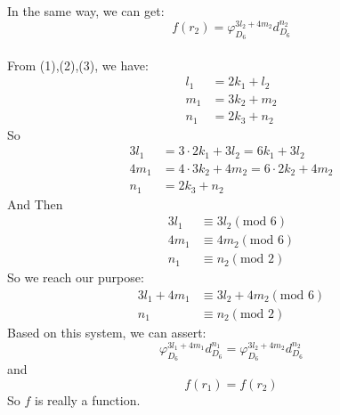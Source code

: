 \documentclass[12pt]{article}
\theoremstyle{neosn}
\begin{document}
    In the same way, we can get:
    $$f(r_2)=\varphi_{D_6}^{3l_2+4m_2}d_{D_6}^{n_2}$$\\  
    From (1),(2),(3), we have:
    \begin{align*}
        l_1 &= 2k_1+l_2\\
        m_1 &=3k_2+m_2\\
        n_1 &=2k_3+n_2
    \end{align*}
    So
    \begin{align*}
        3l_1 &= 3\cdot 2k_1+3l_2=6k_1+3l_2\\
        4m_1 &= 4\cdot 3k_2+4m_2=6\cdot 2k_2 + 4m_2\\
        n_1 &= 2k_3+n_2
    \end{align*}
    And Then
    \begin{align*}
        3l_1 &\equiv 3l_2 (\text{mod 6})\\
        4m_1 &\equiv 4m_2 (\text{mod 6})\\
        n_1 &\equiv n_2 (\text{mod 2})
    \end{align*}
    So we reach our purpose:
    \begin{align*}
        3l_1+4m_1 &\equiv 3l_2+4m_2 (\text{mod 6})\\
        n_1 &\equiv n_2 (\text{mod 2})
    \end{align*}
    Based on this system, we can assert:
    $$\varphi_{D_6}^{3l_1+4m_1}d_{D_6}^{n_1} = \varphi_{D_6}^{3l_2+4m_2}d_{D_6}^{n_2}$$
    and
    $$f(r_1)=f(r_2)$$
    So $f$ is really a function.\\
\end{document}
